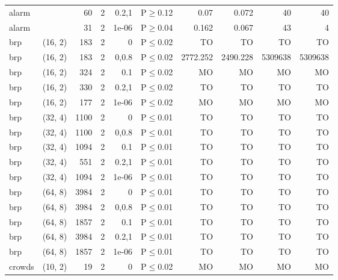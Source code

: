\begin{longtable}{llrrrlrrrr}
 alarm         &          &     	60 &   2 & 0.2,1 & P$\geq$0.12  & 0.07     & 0.072    & 40      & 40      \\
 alarm         &          &     	31 &   2 & 1e-06 & P$\geq$0.04  & 0.162    & 0.067    & 43      & 4       \\
 brp           & (16, 2)  &    	183 &   2 & 0     & P$\leq$0.02  & TO       & TO       & TO      & TO      \\
 brp           & (16, 2)  &    	183 &   2 & 0,0.8 & P$\leq$0.02  & 2772.252 & 2490.228 & 5309638 & 5309638 \\
 brp           & (16, 2)  &    	324 &   2 & 0.1   & P$\leq$0.02  & MO       & MO       & MO      & MO      \\
 brp           & (16, 2)  &    	330 &   2 & 0.2,1 & P$\leq$0.02  & TO       & TO       & TO      & TO      \\
 brp           & (16, 2)  &    	177 &   2 & 1e-06 & P$\leq$0.02  & MO       & MO       & MO      & MO      \\
 brp           & (32, 4)  &   	1100 &   2 & 0     & P$\leq$0.01  & TO       & TO       & TO      & TO      \\
 brp           & (32, 4)  &   	1100 &   2 & 0,0.8 & P$\leq$0.01  & TO       & TO       & TO      & TO      \\
 brp           & (32, 4)  &   	1094 &   2 & 0.1   & P$\leq$0.01  & TO       & TO       & TO      & TO      \\
 brp           & (32, 4)  &    	551 &   2 & 0.2,1 & P$\leq$0.01  & TO       & TO       & TO      & TO      \\
 brp           & (32, 4)  &   	1094 &   2 & 1e-06 & P$\leq$0.01  & TO       & TO       & TO      & TO      \\
 brp           & (64, 8)  &   	3984 &   2 & 0     & P$\leq$0.01  & TO       & TO       & TO      & TO      \\
 brp           & (64, 8)  &   	3984 &   2 & 0,0.8 & P$\leq$0.01  & TO       & TO       & TO      & TO      \\
 brp           & (64, 8)  &   	1857 &   2 & 0.1   & P$\leq$0.01  & TO       & TO       & TO      & TO      \\
 brp           & (64, 8)  &   	3984 &   2 & 0.2,1 & P$\leq$0.01  & TO       & TO       & TO      & TO      \\
 brp           & (64, 8)  &   	1857 &   2 & 1e-06 & P$\leq$0.01  & TO       & TO       & TO      & TO      \\
 crowds        & (10, 2)  &     	19 &   2 & 0     & P$\leq$0.02  & MO       & MO       & MO      & MO      \\

\end{longtable}
